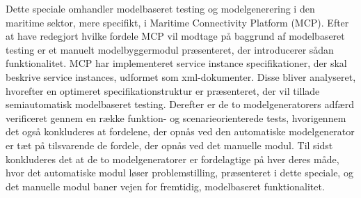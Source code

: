 \documentclass[a4paper,11pt,oneside]{memoir}
\begin{document}
\begin{resume}
\noindent
Dette speciale omhandler modelbaseret testing og modelgenerering i den maritime sektor, mere specifikt, i Maritime Connectivity Platform (MCP). Efter at have redegjort hvilke fordele MCP vil modtage på baggrund af modelbaseret testing er et manuelt modelbyggermodul præsenteret, der introducerer sådan funktionalitet. MCP har implementeret service instance specifikationer, der skal beskrive service instances, udformet som xml-dokumenter. Disse bliver analyseret, hvorefter en optimeret specifikationstruktur er præsenteret, der vil tillade semiautomatisk modelbaseret testing. Derefter er de to modelgeneratorers adfærd verificeret gennem en række funktion- og scenarieorienterede tests, hvorigennem det også konkluderes at fordelene, der opnås ved den automatiske modelgenerator er tæt på tilsvarende de fordele, der opnås ved det manuelle modul. Til sidst konkluderes det at de to modelgeneratorer er fordelagtige på hver deres måde, hvor det automatiske modul løser problemstilling, præsenteret i dette speciale, og det manuelle modul baner vejen for fremtidig, modelbaseret funktionalitet.
\end{resume}



\cleardoublepage
{}
\tableofcontents*

\cleardoublepage
{}
\setcounter{page}{1}





\displayCounterChp



\displayCounterChp

\end{document}
